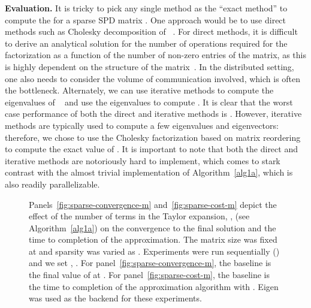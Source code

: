 \vspace{0.02in}\noindent \textbf{Evaluation.}
\noindent
It is tricky to pick any single method as the ``exact method'' to compute the
 for a sparse SPD matrix .
One approach would be to use direct methods such as Cholesky decomposition of
~\cite{davis2006direct,gupta2000wsmp}.
For direct methods, it is difficult to derive an analytical solution
for the number of operations required for the factorization as a function of the
number of non-zero entries of the matrix, as this is highly dependent on the structure of
the matrix~\cite{gupta1997highly}.
In the distributed setting, one also needs to consider the volume of
communication involved, which is often the bottleneck.
Alternately, we can use iterative methods to compute the eigenvalues of
~\cite{davidson1975iterative} and use the eigenvalues to compute
.
It is clear that the worst case performance of both the direct and iterative
methods is .
However, iterative methods are typically used to compute a few eigenvalues and
eigenvectors: therefore, we chose to use the Cholesky factorization based on
matrix reordering to compute the exact value of .
It is important to note that both the direct and iterative methods are
notoriously hard to implement, which comes to stark contrast with the almost trivial implementation of Algorithm~\ref{alg1a}, which is also readily parallelizable.
\begin{figure}[t]
\begin{center}
\end{center}
\caption{
Panels~\ref{fig:sparse-convergence-m} and~\ref{fig:sparse-cost-m} depict the
effect of the number of terms in the Taylor expansion, , (see
Algorithm~\ref{alg1a}) on the convergence to the final solution and the time to
completion of the approximation.
The matrix size was fixed at  and sparsity was varied as .
Experiments were run sequentially () and we set , .
For panel~\ref{fig:sparse-convergence-m}, the baseline is the final value of
 at .
For panel~\ref{fig:sparse-cost-m}, the baseline is the time to completion of the approximation algorithm with .
Eigen was used as the backend for these experiments.
}
\label{fig:sparse}
\end{figure}


